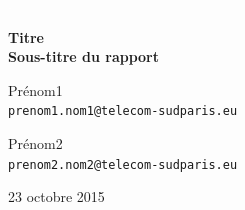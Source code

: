 \documentclass{report}
\begin{document}
\begin{titlepage}
  \begin{centering}
  \textcolor{white}{.}\\
  \vspace{45mm}
  \begin{Huge}
    \textbf{Titre}\\
    \vspace{5 mm}
    \textbf{Sous-titre du rapport}\\
  \end{Huge}
  \vspace{20 mm}

  \begin{normalsize}
    Prénom1 \\
    \texttt{prenom1.nom1@telecom-sudparis.eu}\\
  \end{normalsize}

  \vspace{5 mm}

  \begin{normalsize}
     Prénom2 \\
    \texttt{prenom2.nom2@telecom-sudparis.eu}\\
  \end{normalsize}

  \vspace{10 mm}

  \begin{normalsize}
    23 octobre 2015
  \end{normalsize}

  \end{centering}
  \vfill



\end{titlepage}
\end{document}
